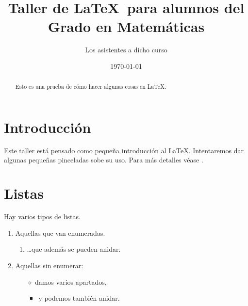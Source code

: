 \documentclass[11pt]{amsart}
\title[Taller de \LaTeX]{Taller de \LaTeX\ para alumnos del Grado en Matemáticas}
\author[Los presentes]{Los asistentes a dicho curso}
\date{\today}
\begin{document}
\begin{abstract}
Esto es una prueba de cómo hacer algunas cosas en \LaTeX. 
\end{abstract}

\maketitle

\tableofcontents


\section*{Introducción}

Este taller está pensado como pequeña introducción al \LaTeX. Intentaremos dar algunas pequeñas pinceladas sobe su uso. Para m\'as detalles véase \cite{lshort}.

\section{Listas}

Hay varios tipos de listas.
\begin{enumerate}[1)]
\item Aquellas que van enumeradas.
	\begin{enumerate}
	\item \ldots que además se pueden anidar.
	\end{enumerate}

\item Aquellas sin enumerar:
\begin{itemize}
\item[$\diamond$] damos varios apartados, %
\begin{itemize}
\item y podemos también anidar.
\end{itemize}
\end{itemize}
\end{enumerate}
\end{document}

